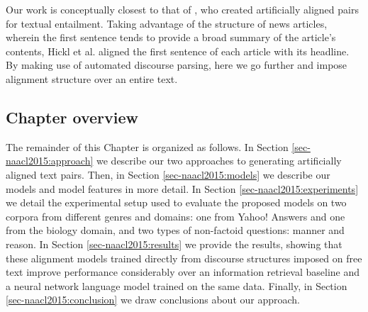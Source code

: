 Our work is conceptually closest to that of \citet{hickl2006recognizing}, who created artificially aligned pairs for textual entailment.  Taking advantage of the structure of news articles, wherein the first sentence tends to provide a broad summary of the article's contents, Hickl et al. aligned the first sentence of each article with its headline.  By making use of automated discourse parsing, here we go further and impose alignment structure over an entire text.

\subsection{Chapter overview}

The remainder of this Chapter is organized as follows.  In Section \ref{sec-naacl2015:approach} we describe our two approaches to generating artificially aligned text pairs.  Then, in Section \ref{sec-naacl2015:models} we describe our models and model features in more detail.  In Section \ref{sec-naacl2015:experiments} we detail the experimental setup used to evaluate the proposed models on two corpora from different genres and domains: one from Yahoo! Answers and one from the biology domain, and two types of non-factoid questions: manner and reason. In Section \ref{sec-naacl2015:results} we provide the results, showing that these alignment models trained directly from discourse structures imposed on free text
improve performance considerably over an information retrieval baseline and a neural network language model trained on the same data.  Finally, in Section \ref{sec-naacl2015:conclusion} we draw conclusions about our approach.

